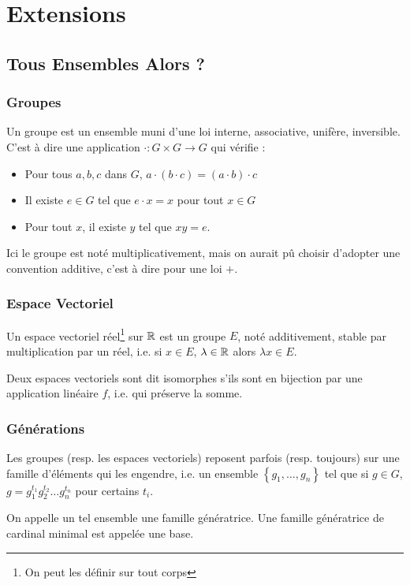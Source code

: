 \documentclass{beamercours}
\begin{document}
\section{Extensions}

\subsection{Tous Ensembles Alors ?}

\begin{frame}
    \frametitle{Groupes}
    Un groupe est un ensemble muni d'une loi interne, associative, unifère, inversible. C'est à dire une application $\cdot : G \times G \rightarrow G$ qui vérifie : 
    \begin{itemize}
        \item Pour tous $a, b, c$ dans $G$, $a \cdot (b \cdot c) = (a\cdot b) \cdot c$
        \item Il existe $e \in G$ tel que $e \cdot x = x$ pour tout $x \in G$
        \item Pour tout $x$, il existe $y$ tel que $xy = e$.
    \end{itemize}
    Ici le groupe est noté multiplicativement, mais on aurait pû choisir d'adopter une convention additive, c'est à dire pour une loi $+$.
\end{frame}

\begin{frame}
    \frametitle{Espace Vectoriel}
    Un espace vectoriel réel\footnote{On peut les définir sur tout corps} sur $\mathbb{R}$ est un groupe $E$, noté additivement, stable par multiplication par un réel, i.e. si $x \in E$, $\lambda \in \mathbb{R}$ alors $\lambda x \in E$.
    
    Deux espaces vectoriels sont dit isomorphes s'ils sont en bijection par une application linéaire $f$, i.e. qui préserve la somme.

\end{frame}

\begin{frame}
    \frametitle{Générations}
    Les groupes (resp. les espaces vectoriels) reposent parfois (resp. toujours) sur une famille d'éléments qui les engendre, i.e. un ensemble $\left\{g_{1},\ldots, g_{n}\right\}$ tel que si $g \in G$, $g = g_{1}^{t_{1}}g_{2}^{t_{2}}\ldots g_{n}^{t_{n}}$ pour certains $t_{i}$.
    
    On appelle un tel ensemble une famille génératrice. Une famille génératrice de cardinal minimal est appelée une base.

    
\end{frame}
\end{document}
